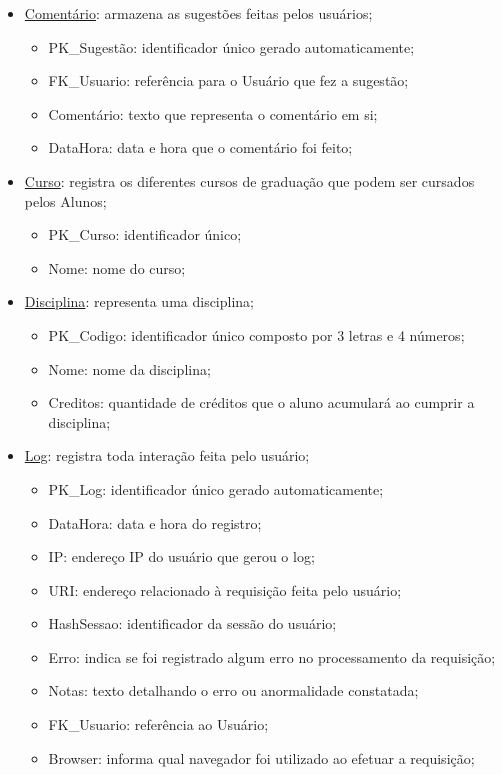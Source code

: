 \documentclass[graduacao,brazil]{ThesisPUC}
\begin{document}
\begin{itemize}
	\item \underline{Comentário}: armazena as sugestões feitas pelos usuários;
	\begin{itemize}
		\item PK\_Sugestão: identificador único gerado automaticamente;
		\item FK\_Usuario: referência para o Usuário que fez a sugestão;
		\item Comentário: texto que representa o comentário em si;
		\item DataHora: data e hora que o comentário foi feito;
	\end{itemize}

	\item \underline{Curso}: registra os diferentes cursos de graduação que podem ser cursados pelos Alunos;
	\begin{itemize}
		\item PK\_Curso: identificador único;
		\item Nome: nome do curso;
	\end{itemize}

	\item \underline{Disciplina}: representa uma disciplina;
	\begin{itemize}
		\item PK\_Codigo: identificador único composto por 3 letras e 4 números;
		\item Nome: nome da disciplina;
		\item Creditos: quantidade de créditos que o aluno acumulará ao cumprir a disciplina;
	\end{itemize}

	\item \underline{Log}: registra toda interação feita pelo usuário;
	\begin{itemize}
		\item PK\_Log: identificador único gerado automaticamente;
		\item DataHora: data e hora do registro;
		\item IP: endereço IP do usuário que gerou o log;
		\item URI: endereço relacionado à requisição feita pelo usuário;
		\item HashSessao: identificador da sessão do usuário;
		\item Erro: indica se foi registrado algum erro no processamento da requisição;
		\item Notas: texto detalhando o erro ou anormalidade constatada;
		\item FK\_Usuario: referência ao Usuário;
		\item Browser: informa qual navegador foi utilizado ao efetuar a requisição;
	\end{itemize}


\end{itemize}
\end{document}
